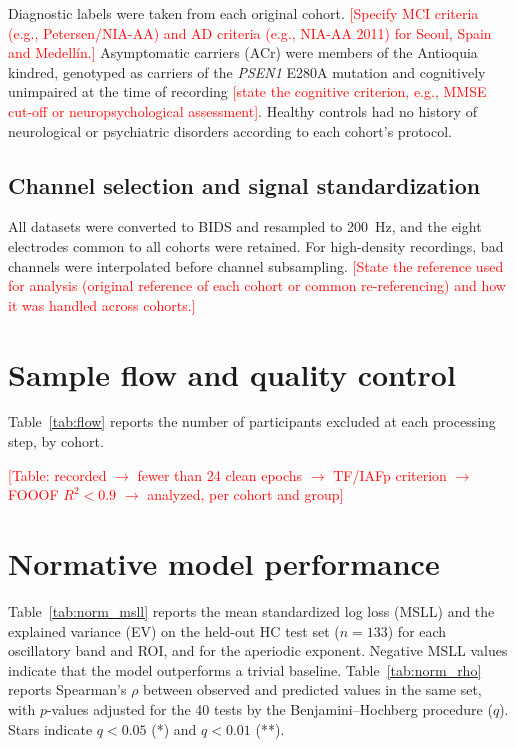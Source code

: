 \documentclass[11pt]{article}
\newcommand{\pend}[1]{\textcolor{red}{[#1]}}
\begin{document}
Diagnostic labels were taken from each original cohort. \pend{Specify MCI criteria (e.g., Petersen/NIA-AA) and AD criteria (e.g., NIA-AA 2011) for Seoul, Spain and Medell\'in.} Asymptomatic carriers (ACr) were members of the Antioquia kindred, genotyped as carriers of the \textit{PSEN1} E280A mutation and cognitively unimpaired at the time of recording \pend{state the cognitive criterion, e.g., MMSE cut-off or neuropsychological assessment}. Healthy controls had no history of neurological or psychiatric disorders according to each cohort's protocol.

\subsection{Channel selection and signal standardization}

All datasets were converted to BIDS and resampled to 200~Hz, and the eight electrodes common to all cohorts were retained. For high-density recordings, bad channels were interpolated before channel subsampling. \pend{State the reference used for analysis (original reference of each cohort or common re-referencing) and how it was handled across cohorts.}

\section{Sample flow and quality control}

Table~\ref{tab:flow} reports the number of participants excluded at each processing step, by cohort.

\begin{table}[ht]
\centering
\caption{Participants excluded at each processing step, by cohort.}
\label{tab:flow}
\pend{Table: recorded $\rightarrow$ fewer than 24 clean epochs $\rightarrow$ TF/IAFp criterion $\rightarrow$ FOOOF $R^2<0.9$ $\rightarrow$ analyzed, per cohort and group}
\end{table}

\section{Normative model performance}

Table~\ref{tab:norm_msll} reports the mean standardized log loss (MSLL) and the explained variance (EV) on the held-out HC test set ($n=133$) for each oscillatory band and ROI, and for the aperiodic exponent. Negative MSLL values indicate that the model outperforms a trivial baseline. Table~\ref{tab:norm_rho} reports Spearman's $\rho$ between observed and predicted values in the same set, with $p$-values adjusted for the 40 tests by the Benjamini--Hochberg procedure ($q$). Stars indicate $q<0.05$ (*) and $q<0.01$ (**).
\end{document}
